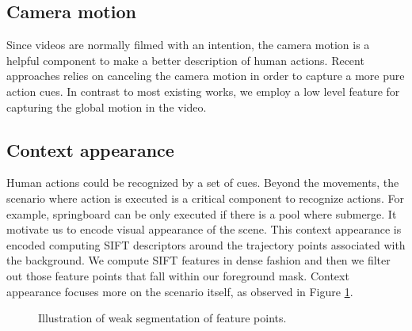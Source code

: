 \subsection{Camera motion}
Since videos are normally filmed with an intention, the camera motion is a helpful component to make a better description of human actions. Recent approaches relies on canceling the camera motion in order to capture a more pure action cues. In contrast to most existing works, we employ a low level feature for capturing the global motion in the video. 
\subsection{Context appearance}
Human actions could be recognized by a set of cues. Beyond the movements, the scenario where action is executed is a critical component to recognize actions. For example, springboard can be only executed if there is a pool where submerge. It motivate us to encode visual appearance of the scene. This context appearance is encoded computing SIFT \cite{lowe2004} descriptors around the trajectory points associated with the background. We compute SIFT features in dense fashion and then we filter out those feature points that fall within our foreground mask. Context appearance focuses more on the scenario itself, as observed in Figure \ref{fig:surrounding-features}. 

\begin{figure}[t!]
\begin{center}
\fbox{\rule{0pt}{1in} \rule{0.9\linewidth}{0pt}}
\end{center}
\caption{Illustration of weak segmentation of feature points. }
\label{fig:surrounding-features}
\end{figure}
